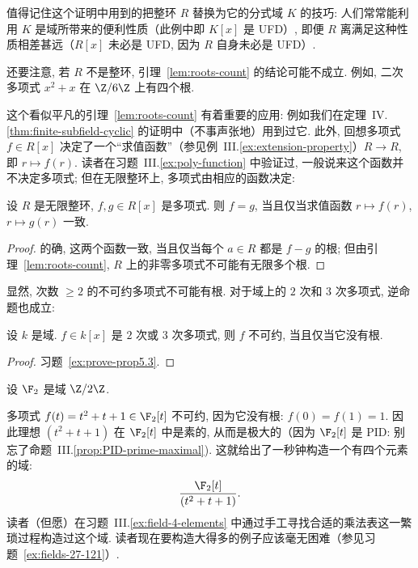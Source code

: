 值得记住这个证明中用到的把整环 $R$ 替换为它的分式域 $K$ 的技巧: 人们常常能利用 $K$ 是域所带来的便利性质（此例中即 $K[x]$ 是 UFD）, 即便 $R$ 离满足这种性质相差甚远（$R[x]$ 未必是 UFD, 因为 $R$ 自身未必是 UFD）.

还要注意, 若 $R$ 不是整环, 引理~\ref{lem:roots-count} 的结论可能不成立. 例如, 二次多项式 $x^2+x$ 在 $\Z/6\Z$ 上有四个根.

这个看似平凡的引理~\ref{lem:roots-count} 有着重要的应用: 例如我们在定理~IV.\ref{thm:finite-subfield-cyclic} 的证明中（不事声张地）用到过它. 此外, 回想多项式 $f\in R[x]$ 决定了一个``求值函数''（参见例~III.\ref{ex:extension-property}）$R\to R$, 即 $r\mapsto f(r)$. 读者在习题~III.\ref{ex:poly-function} 中验证过, 一般说来这个函数并不决定多项式; 但在无限整环上, 多项式由相应的函数决定:

\begin{corollary}\label{cor:eval-func-detect}
设 $R$ 是无限整环, $f,g\in R[x]$ 是多项式. 则 $f=g$, 当且仅当求值函数 $r\mapsto f(r)$, $r\mapsto g(r)$ 一致.
\end{corollary}

\begin{proof}
的确, 这两个函数一致, 当且仅当每个 $a\in R$ 都是 $f-g$ 的根; 但由引理~\ref{lem:roots-count}, $R$ 上的非零多项式不可能有无限多个根.
\end{proof}

显然, 次数 $\geq 2$ 的不可约多项式不可能有根. 对于域上的 $2$ 次和 $3$ 次多项式, 逆命题也成立:

\begin{proposition}\label{prop:irred-deg2-3}
设 $k$ 是域. $f\in k[x]$ 是 $2$ 次或 $3$ 次多项式, 则 $f$ 不可约, 当且仅当它没有根.
\end{proposition}

\begin{proof}
习题~\ref{ex:prove-prop5.3}.
\end{proof}

\begin{example}\label{ex:f2-field4}
设 $\F_2$ 是域 $\Z/2\Z$.

多项式 $f(t)=t^2+t+1\in\F_2[t]$ 不可约, 因为它没有根: $f(0)=f(1)=1$. 因此理想 $(t^2+t+1)$ 在 $\F_2[t]$ 中是素的, 从而是极大的（因为 $\F_2[t]$ 是 PID: 别忘了命题~III.\ref{prop:PID-prime-maximal}). 这就给出了一秒钟构造一个有四个元素的域:
\[
\frac{\F_2[t]}{(t^2+t+1)}.
\]
读者（但愿）在习题~III.\ref{ex:field-4-elements} 中通过手工寻找合适的乘法表这一繁琐过程构造过这个域. 读者现在要构造大得多的例子应该毫无困难（参见习题~\ref{ex:fields-27-121}）.
\end{example}

